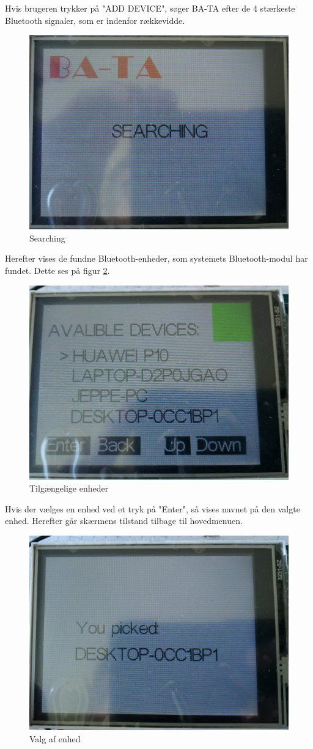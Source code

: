 Hvis brugeren trykker på "ADD DEVICE", søger BA-TA efter de 4 stærkeste Bluetooth signaler, som er indenfor rækkevidde. 
\begin{figure}[H]
	\centering
	\includegraphics[width = 300 pt]{Img/Searching.jpg}
	\caption{Searching}
	\label{fig:Searching}
\end{figure}
Herefter vises de fundne Bluetooth-enheder, som systemets Bluetooth-modul har fundet. Dette ses på figur \ref{fig:devices}.
\begin{figure}[H]
	\centering
	\includegraphics[width = 300 pt]{Img/devices.jpg}
	\caption{Tilgængelige enheder}
	\label{fig:devices}
\end{figure}
Hvis der vælges en enhed ved et tryk på "Enter", så vises navnet på den valgte enhed. Herefter går skærmens tilstand tilbage til hovedmenuen. 
\begin{figure}[H]
	\centering
	\includegraphics[width = 300 pt]{Img/pick.jpg}
	\caption{Valg af enhed}
	\label{fig:pick}
\end{figure}

